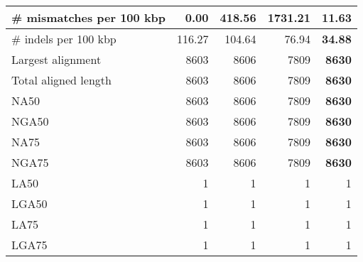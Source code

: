\documentclass[12pt,a4paper]{article}
\begin{document}
\begin{table}[ht]
\begin{center}
\begin{tabular}{|l*{4}{|r}|}
\# mismatches per 100 kbp & {\bf 0.00} & 418.56 & 1731.21 & 11.63 \\ \hline
\# indels per 100 kbp & 116.27 & 104.64 & 76.94 & {\bf 34.88} \\ \hline
Largest alignment & 8603 & 8606 & 7809 & {\bf 8630} \\ \hline
Total aligned length & 8603 & 8606 & 7809 & {\bf 8630} \\ \hline
NA50 & 8603 & 8606 & 7809 & {\bf 8630} \\ \hline
NGA50 & 8603 & 8606 & 7809 & {\bf 8630} \\ \hline
NA75 & 8603 & 8606 & 7809 & {\bf 8630} \\ \hline
NGA75 & 8603 & 8606 & 7809 & {\bf 8630} \\ \hline
LA50 & 1 & 1 & 1 & 1 \\ \hline
LGA50 & 1 & 1 & 1 & 1 \\ \hline
LA75 & 1 & 1 & 1 & 1 \\ \hline
LGA75 & 1 & 1 & 1 & 1 \\ \hline
\end{tabular}
\end{center}
\end{table}
\end{document}
